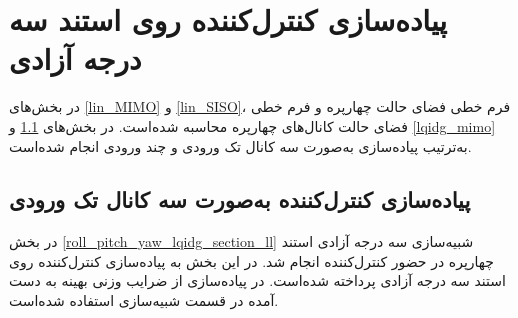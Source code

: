 \section{پیاده‌سازی کنترل‌کننده  روی استند سه درجه آزادی}\label{3DOF_lqidg_section}
در بخش‌های
\ref{lin_MIMO}
و
\ref{lin_SISO}،
فرم خطی فضای حالت چهارپره و فرم خطی فضای حالت کانال‌های چهارپره محاسبه شده‌است. در بخش‌های
\ref{lqidg_siso}
و
\ref{lqidg_mimo}
به‌ترتیب پیاده‌سازی به‌صورت سه کانال تک ورودی و چند ورودی انجام شده‌است.

\subsection{پیاده‌سازی کنترل‌کننده به‌صورت سه کانال تک ورودی}\label{lqidg_siso}
در بخش
\ref{roll_pitch_yaw_lqidg_section_ll}
شبیه‌سازی سه درجه آزادی استند چهارپره در حضور کنترل‌کننده  انجام شد. در این بخش به پیاده‌سازی کنترل‌کننده  روی استند سه درجه آزادی پرداخته شده‌است.
در پیاده‌سازی از ضرایب وزنی بهینه به دست آمده در قسمت شبیه‌سازی استفاده شده‌است.


